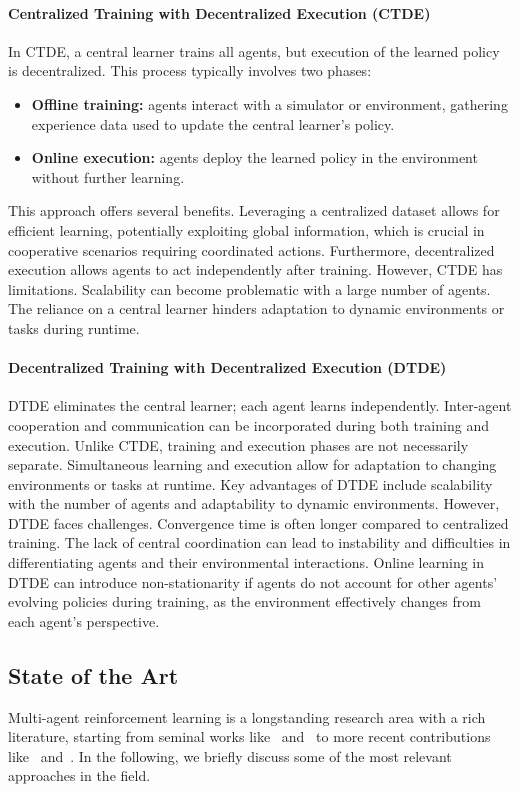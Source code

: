 \documentclass[sigconf]{acmart}
\begin{document}
\paragraph{Centralized Training with Decentralized Execution (CTDE)}
In CTDE, a central learner trains all agents, 
but execution of the learned policy is decentralized. 
This process typically involves two phases:
\begin{itemize}
    \item \textbf{Offline training:} agents interact with a simulator or environment, 
    gathering experience data used to update the central learner's policy.
    \item \textbf{Online execution:} agents deploy the learned policy in the environment without further learning.
\end{itemize}
This approach offers several benefits.  
Leveraging a centralized dataset allows for efficient learning, 
potentially exploiting global information, 
which is crucial in cooperative scenarios requiring coordinated actions. 
Furthermore, decentralized execution allows agents to act independently after training.
%
However, CTDE has limitations. 
Scalability can become problematic with a large number of agents. 
The reliance on a central learner hinders adaptation to dynamic environments or tasks during runtime.
\sloppy
\paragraph{Decentralized Training with Decentralized Execution (DTDE)}
DTDE eliminates the central learner; each agent learns independently. 
Inter-agent cooperation and communication can be incorporated during both training and execution. 
Unlike CTDE, training and execution phases are not necessarily separate. 
Simultaneous learning and execution allow for adaptation to changing environments or tasks at runtime.
%
Key advantages of DTDE include scalability with the number of agents and adaptability to dynamic environments.
%
However, DTDE faces challenges. 
Convergence time is often longer compared to centralized training. 
The lack of central coordination can lead to instability and difficulties in differentiating agents and their environmental interactions. 
Online learning in DTDE can introduce non-stationarity if agents do not account for other agents' evolving policies during training, 
as the environment effectively changes from each agent's perspective.

\subsection{State of the Art}
Multi-agent reinforcement learning is a longstanding research area with a rich literature, starting 
from seminal works like~\cite{tan1993multi} and~\cite{busoniu2008comprehensive} to more recent contributions like~\cite{gronauer2022multi} and~\cite{canese2021multi}.
%
In the following, we briefly discuss some of the most relevant approaches in the field.
\end{document}

